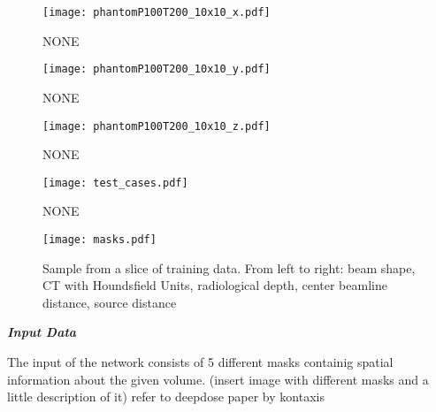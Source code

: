 \begin{figure}
	\centering
    \texttt{[image: phantomP100T200\_10x10\_x.pdf]}
    \caption{NONE}
    \label{fig: test}
\end{figure}
\begin{figure}
	\centering
    \texttt{[image: phantomP100T200\_10x10\_y.pdf]}
    \caption{NONE}
    \label{fig: test}
\end{figure}

\begin{figure}
	\centering
    \texttt{[image: phantomP100T200\_10x10\_z.pdf]}
    \caption{NONE}
    \label{fig: test}
\end{figure}

\begin{figure}
	\centering
    \texttt{[image: test\_cases.pdf]}
    \caption{NONE}
    \label{fig: test}
\end{figure}

\begin{figure}
	\centering
    \texttt{[image: masks.pdf]}
    \caption{Sample from a slice of training data. From left to right: beam shape, CT with Houndsfield Units, radiological depth, center beamline distance, source distance}
    \label{fig: test}
\end{figure}

\textbf{\emph{Input Data}}

The input of the network consists of 5 different masks containig spatial information about the given volume. (insert image with different masks and a little description of it) refer to deepdose paper by kontaxis \cite{kontaxis_deepdose_2020}


